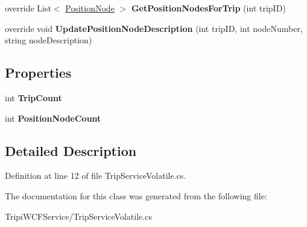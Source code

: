 \begin{DoxyCompactItemize}
\item 
\hypertarget{class_tripi_w_c_f_1_1_service_1_1_trip_service_volatile_ac36ba08065bf68d67248557267dcaa16}{
override List$<$ \hyperlink{class_tripi_w_c_f_1_1_service_1_1_position_node}{PositionNode} $>$ {\bfseries GetPositionNodesForTrip} (int tripID)}
\label{class_tripi_w_c_f_1_1_service_1_1_trip_service_volatile_ac36ba08065bf68d67248557267dcaa16}

\item 
\hypertarget{class_tripi_w_c_f_1_1_service_1_1_trip_service_volatile_a49be0719f6791535321af25d4af1ae76}{
override void {\bfseries UpdatePositionNodeDescription} (int tripID, int nodeNumber, string nodeDescription)}
\label{class_tripi_w_c_f_1_1_service_1_1_trip_service_volatile_a49be0719f6791535321af25d4af1ae76}

\end{DoxyCompactItemize}
\subsection*{Properties}
\begin{DoxyCompactItemize}
\item 
\hypertarget{class_tripi_w_c_f_1_1_service_1_1_trip_service_volatile_af968ca6fb4f5b447fe6e578b33e4c9e5}{
int {\bfseries TripCount}}
\label{class_tripi_w_c_f_1_1_service_1_1_trip_service_volatile_af968ca6fb4f5b447fe6e578b33e4c9e5}

\item 
\hypertarget{class_tripi_w_c_f_1_1_service_1_1_trip_service_volatile_a4acd49e612ff64c09b006e5e5e8d9f20}{
int {\bfseries PositionNodeCount}}
\label{class_tripi_w_c_f_1_1_service_1_1_trip_service_volatile_a4acd49e612ff64c09b006e5e5e8d9f20}

\end{DoxyCompactItemize}


\subsection{Detailed Description}


Definition at line 12 of file TripServiceVolatile.cs.

The documentation for this class was generated from the following file:\begin{DoxyCompactItemize}
\item 
TripiWCFService/TripServiceVolatile.cs\end{DoxyCompactItemize}
